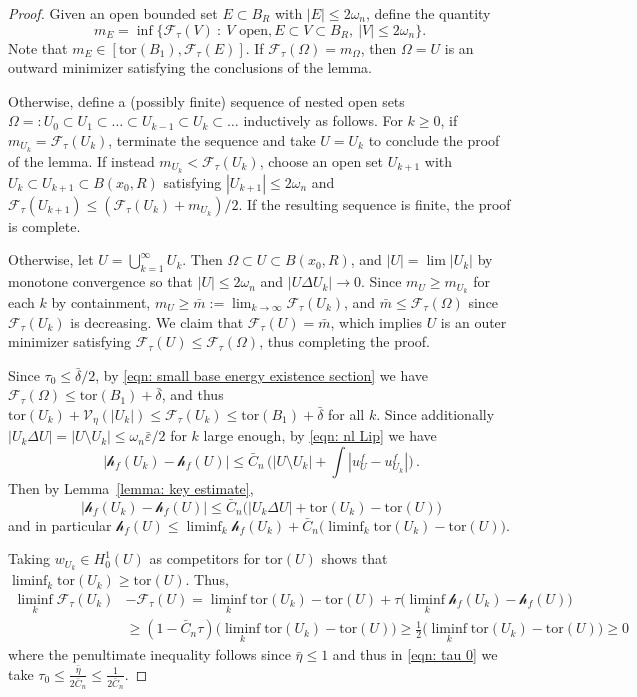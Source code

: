 \documentclass[10pt, reqno]{amsart}
\numberwithin{equation}{section}
\def\e{\varepsilon}
\def\W{\Omega}
\def\om{\omega}
\def\tor{\mathrm{tor}}
\def\vpar{\eta}
\def\fv{\mathscr{V}_{\vpar}}
\def\err{\tau}
\def\Ep{\mathcal{F}_{\err}}
\def\nl{\mathscr{h}_f}
\def\baryEps{\bar{\e}}
\begin{document}
\begin{proof}
Given an open bounded set $E\subset B_R$ with $|E|\leq 2\omega_n$, define the quantity
	$$m_E = \inf \big\{\Ep(V) \ : \ V \text{ open}, E\subset V\subset B_R, \ |V|\leq 2 \omega_n \big\}.
	$$
Note that $m_E \in [\tor(B_1), \Ep(E)]$.  If $\Ep(\W)= m_\W$, then $\W=U$ is an outward minimizer satisfying the conclusions of the lemma. 

Otherwise, define a (possibly finite) sequence of nested open sets $\W=:U_0 \subset U_1 \subset \dots \subset U_{k-1} \subset U_{k}\subset \dots$ inductively as follows. 
For $k\geq 0$,  if $m_{U_k} = \Ep(U_k)$, terminate the sequence and take $U=U_k$ to conclude the proof of the lemma. If instead $m_{U_k} < \Ep(U_k)$,  choose an open set $U_{k+1}$ with $U_k \subset U_{k+1} \subset B(x_0,R)$ satisfying $|U_{k+1}|\leq 2\omega_n$ and $\Ep(U_{k+1} ) \leq (\Ep(U_k)+m_{U_k})/2.$ If the resulting sequence is finite, the proof is complete.

 Otherwise, let $U =\bigcup_{k=1}^\infty U_k$. Then $\W\subset U\subset B(x_0,R)$, and  $|U| = \lim |U_k|$ by monotone convergence so that $|U|\leq 2\om_n$ and $|U\Delta U_k|\to 0$. Since $m_U \geq m_{U_k}$  for each $k$ by containment, $m_U \geq \bar{m}:=\lim_{k\to \infty} \Ep(U_k)$, and $\bar{m} \leq \Ep(\W)$ since $\Ep(U_k)$ is decreasing.
We claim that $\Ep(U) =\bar{m}$,  which implies $U$ is an outer minimizer satisfying $\Ep(U)  \leq \Ep(\W)$, thus completing the proof. 
 
Since $\tau_0\leq\bar{\delta}/2$, by \eqref{eqn: small base energy existence section} we have $\Ep(\W) \leq \tor(B_1)+\bar{\delta}$, and thus
 $\tor(U_k) + \fv(|U_k|) \leq \Ep(U_k) \leq  \tor(B_1) + \bar{\delta}$
for all $k$. Since additionally  $|U_k\Delta U|= |U\setminus U_k| \leq \omega_n  \baryEps /{2}$ for $k$ large enough, by \eqref{eqn: nl Lip} we have
$$
\ |\nl(U_k) - \nl(U)|  \leq \bar{C}_n\,\Big( |U\setminus U_k| +\int |u_{U}^f - u_{U_k}^f|\Big)\,.
$$
 Then by Lemma~\ref{lemma: key estimate}, 
 $$\ |\nl(U_k) - \nl(U)| \leq \bar{C}_n\big(|U_k\Delta U| + \tor(U_k) - \tor(U)\big)
 $$
and in particular $\nl(U) \leq \liminf_k \nl(U_k) + \bar{C}_n\big(\liminf_k \tor(U_k) - \tor(U)\big)$. 
   
 
Taking $w_{U_k}\in H^1_0(U)$ as competitors for $\tor(U)$ shows that $\liminf_k \tor(U_k) \geq \tor(U)$. Thus, 
\begin{align*}
\liminf_k \Ep(U_k) &-	\Ep(U) = \liminf_k \tor(U_k) -\tor(U) + \tau \big( \liminf_k \nl(U_k)  -\nl(U)\big) \\
	& \geq (1- \bar{C}_n\tau)\big(\liminf_k \tor(U_k) - \tor(U)\big)\geq \frac{1}{2}\big(\liminf_k \tor(U_k) - \tor(U)\big) \geq 0
\end{align*}
 where the penultimate inequality follows since $\bar \eta \leq 1$ and thus in \eqref{eqn: tau 0} we take  $\tau_0 \leq \tfrac{\bar\eta}{2\bar{C}_n} \leq \tfrac{1}{2\bar{C}_n}$.
 \end{proof}
\end{document}
